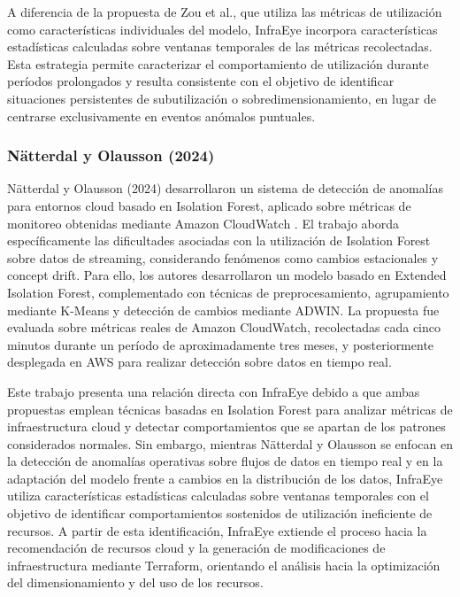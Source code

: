 A diferencia de la propuesta de Zou et al., que utiliza las métricas de utilización como características individuales del modelo, InfraEye incorpora características estadísticas calculadas sobre ventanas temporales de las métricas recolectadas. Esta estrategia permite caracterizar el comportamiento de utilización durante períodos prolongados y resulta consistente con el objetivo de identificar situaciones persistentes de subutilización o sobredimensionamiento, en lugar de centrarse exclusivamente en eventos anómalos puntuales.

\subsubsection{Nätterdal y Olausson (2024)}

Nätterdal y Olausson (2024) desarrollaron un sistema de detección de anomalías para entornos cloud basado en Isolation Forest, aplicado sobre métricas de monitoreo obtenidas mediante Amazon CloudWatch \parencite{Natterdal2024}. El trabajo aborda específicamente las dificultades asociadas con la utilización de Isolation Forest sobre datos de streaming, considerando fenómenos como cambios estacionales y concept drift. Para ello, los autores desarrollaron un modelo basado en Extended Isolation Forest, complementado con técnicas de preprocesamiento, agrupamiento mediante K-Means y detección de cambios mediante ADWIN. La propuesta fue evaluada sobre métricas reales de Amazon CloudWatch, recolectadas cada cinco minutos durante un período de aproximadamente tres meses, y posteriormente desplegada en AWS para realizar detección sobre datos en tiempo real.

Este trabajo presenta una relación directa con InfraEye debido a que ambas propuestas emplean técnicas basadas en Isolation Forest para analizar métricas de infraestructura cloud y detectar comportamientos que se apartan de los patrones considerados normales. Sin embargo, mientras Nätterdal y Olausson se enfocan en la detección de anomalías operativas sobre flujos de datos en tiempo real y en la adaptación del modelo frente a cambios en la distribución de los datos, InfraEye utiliza características estadísticas calculadas sobre ventanas temporales con el objetivo de identificar comportamientos sostenidos de utilización ineficiente de recursos. A partir de esta identificación, InfraEye extiende el proceso hacia la recomendación de recursos cloud y la generación de modificaciones de infraestructura mediante Terraform, orientando el análisis hacia la optimización del dimensionamiento y del uso de los recursos.

